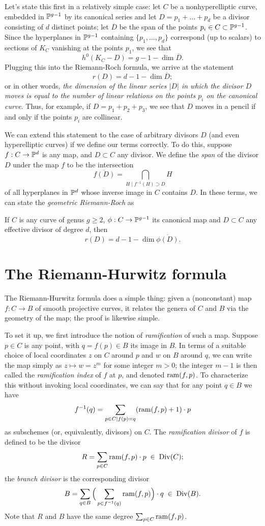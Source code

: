Let's state this first in a relatively simple case: let $C$ be a nonhyperelliptic curve, embedded in $\PP^{g-1}$ by its canonical series and let $D = p_1+\dots + p_d$ be a divisor consisting of $d$ distinct points; let $\overline D$ be the span of the points $p_i \in C \subset \PP^{g-1}$. Since the hyperplanes in $\PP^{g-1}$ containing $\{p_1,\dots,p_d\}$ correspond (up to scalars) to sections of $K_C$ vanishing at the points $p_1$, we see that
$$
h^0(K_C-D) = g - 1 - \dim \overline D.
$$
Plugging this into the Riemann-Roch formula, we arrive at the statement
$$
r(D) = d - 1 - \dim \overline D;
$$
or in other words, \emph{the dimension of the linear series $|D|$ in which the divisor $D$ moves is equal to the number of linear relations on the points $p_i$ on the canonical curve}. Thus, for example, if $D = p_1+p_2+p_3$, we see that $D$ moves in a pencil if and only if the points $p_i$ are collinear.

We can extend this statement to the case of arbitrary divisors $D$ (and even hyperelliptic curves) if we define our terms correctly. To do this, suppose $f : C \to \PP^d$ is any map, and $D \subset C$ any divisor. We define the \emph{span} of the divisor $D$ under the map $f$ to be the intersection
$$
\overline{f(D)} = \bigcap_{H \mid f^{-1}(H)\supset D} H 
$$
of all hyperplanes in $\PP^d$ whose inverse image in $C$ contains $D$. In these terms, we can state the \emph{geometric Riemann-Roch} as

\begin{theorem}
If $C$ is any curve of genus $g \geq 2$,  $\phi : C \to \PP^{g-1}$ its canonical map and $D \subset C$ any effective divisor of degree $d$, then
$$
r(D) = d - 1 - \dim \overline{\phi(D)}.
$$
\end{theorem}

 \section{The Riemann-Hurwitz formula}
 
 The Riemann-Hurwitz formula does a simple thing: given a (nonconstant) map $f : C \to B$ of smooth projective curves, it relates the genera of $C$ and $B$ via the geometry of the map; the proof is likewise simple.
 
 To set it up, we first introduce the notion of \emph{ramification} of such a map. Suppose $p \in C$ is any point, with $q = f(p) \in B$ its image in $B$. In terms of a suitable choice of local coordinates $z$ on $C$ around $p$ and $w$ on $B$ around $q$, we can write the map simply as $z \mapsto w = z^m$ for some integer $m > 0$; the integer $m-1$ is then called the \emph{ramification index} of $f$ at $p$, and denoted $\ram(f,p)$. To characterize this without invoking local coordinates, we can say that for any point $q \in B$ we have
 $$
 f^{-1}(q) = \sum_{p\in C \mid f(p)=q} (\ram(f,p)+1)\cdot p
 $$
 as subschemes (or, equivalently, divisors) on $C$. The \emph{ramification divisor} of $f$ is defined to be the divisor
 $$
 R = \sum_{p \in C} \ram(f,p)\cdot p \; \in \;  \Div(C);
 $$
 the \emph{branch divisor} is the corresponding divisor
 $$
 B = \sum_{q \in B} \Big(\sum_{p \in f^{-1}(q)} \ram(f,p) \Big)\cdot q \; \in \; \Div(B).
 $$
 Note that $R$ and $B$ have the same degree $\sum_{p \in C} \ram(f,p)$.
 
